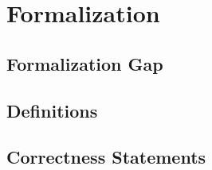 \chapter{Formalization}\label{sec:formalization}

\section{Formalization Gap}

\section{Definitions}

\section{Correctness Statements}
